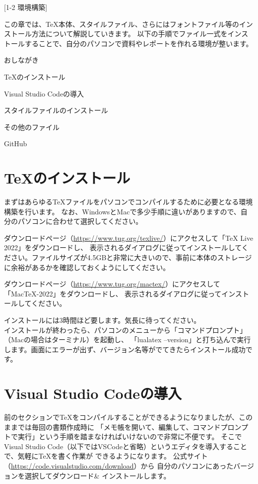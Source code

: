 \newpage
\pagestyle{booklet}
[1-2 環境構築]
\begin{multicols*}{2}
この章では、\TeX 本体、\BunTeX スタイルファイル、さらにはフォントファイル等のインストール方法について解説していきます。
以下の手順でファイル一式をインストールすることで、自分のパソコンで資料やレポートを作れる環境が整います。
\begin{framebox-simple}{おしながき}
\begin{enumsquarebrackets}
    \item \TeX のインストール\footnotemark[1]
    \item Visual Studio Codeの導入
    \item \BunTeX スタイルファイルのインストール
    \item その他のファイル
    \item GitHub
\end{enumsquarebrackets}
\end{framebox-simple}
\section{\TeX のインストール}
まずはあらゆる\TeX ファイルをパソコンでコンパイルするために必要となる環境構築を行います。
なお、WindowsとMacで多少手順に違いがありますので、自分のパソコンに合わせて選択してください。

ダウンロードページ（\url{https://www.tug.org/texlive/}）にアクセスして「TeX Live 2022」をダウンロードし、
表示されるダイアログに従ってインストールしてください。ファイルサイズが4.5GBと非常に大きいので、事前に本体のストレージに余裕があるかを確認しておくようにしてください。

ダウンロードページ（\url{https://www.tug.org/mactex/}）にアクセスして「MacTeX-2022」をダウンロードし、
表示されるダイアログに従ってインストールしてください。

インストールには3時間ほど要します。気長に待ってください。\\
\indent インストールが終わったら、パソコンのメニューから「コマンドプロンプト」（Macの場合はターミナル）を起動し、
「lualatex --version」と打ち込んで実行します。画面にエラーが出ず、バージョン名等がでてきたらインストール成功です。

\section{Visual Studio Codeの導入}
前のセクションで\TeX をコンパイルすることができるようになりましたが、このままでは毎回の書類作成時に
「メモ帳を開いて、編集して、コマンドプロンプトで実行」という手順を踏まなければいけないので非常に不便です。
そこでVisual Studio Code（以下ではVSCodeと省略）というエディタを導入することで、気軽に\TeX を書く作業が
できるようになります。
公式サイト（\url{https://code.visualstudio.com/download}）から
自分のパソコンにあったバージョンを選択してダウンロード\& インストールします。


\end{multicols*}
